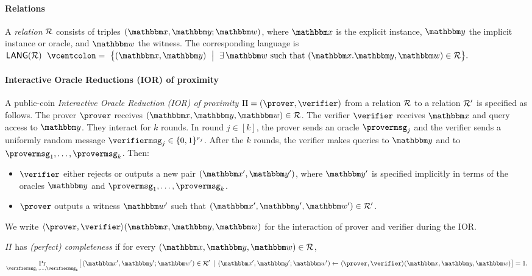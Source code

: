 \documentclass[11pt,letterpaper,usenames,dvipsnames]{article}
\begin{document}
\paragraph{Relations}
A \emph{relation} $\mathcal{R}$ consists of triples  $(\inp,\oracle;\wit)$, where $\inp$ is the explicit instance, $\oracle$ the implicit instance or oracle, and $\wit$ the witness.  The corresponding language  is 
\(
  \LANG(\Relation)\ \defeq\ \bigl\{(\inp,\oracle)\ \bigm|\ \exists\,\wit \text{ such that } (\inp. \oracle,\wit)\in\Relation\bigr\}.
\)


\paragraph{Interactive Oracle Reductions (IOR) of proximity}

A public-coin \emph{Interactive Oracle Reduction (IOR) of proximity} $\Pi=(\prover,\verifier)$ from a relation $\mathcal{R}$ to a relation $\mathcal{R}'$ is specified as follows. The prover $\prover$ receives $(\inp, \oracle,\wit)\in \Relation$. The verifier $\verifier$ receives $\inp$ and query access to $\oracle$. They interact for $k$ rounds. In round $j\in[k]$, the prover sends an oracle $\provermsg_j$ and the verifier sends a uniformly random message $\verifiermsg_j\in\{0,1\}^{r_j}$. After the $k$ rounds, the verifier makes  queries to $\oracle$ and to $\provermsg_1,\ldots,\provermsg_k$. Then:
\begin{itemize}[nosep]
  \item $\verifier$ either rejects or outputs a new  pair $(\inp', \oracle')$, where $\oracle'$ is specified implicitly in terms of the oracles $\oracle$ and $\provermsg_1,\ldots,\provermsg_k$.
  \item $\prover$ outputs a witness $\wit'$ such that $(\inp', \oracle', \wit')\in \Relation'$.
\end{itemize}
We write $ \langle \prover, \verifier\rangle(\inp,\oracle,\wit)$ for the interaction of prover and verifier during the IOR.

\begin{definition}[Completeness]
\label{def:ior-completeness}
$\Pi$ has \emph{(perfect) completeness}  if for every $(\inp, \oracle,\wit)\in\Relation$,
\[
  \Pr_{\verifiermsg_1,\dots,\verifiermsg_k}\bigl[\,(\inp',\oracle';\wit')\in \Relation'\, \mid \, (\inp',\oracle';\wit') \gets \langle \prover, \verifier\rangle(\inp,\oracle,\wit)\bigr]=1.
\]
\end{definition}
\end{document}
